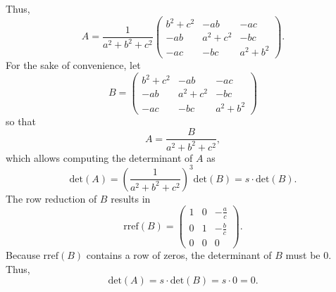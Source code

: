\documentclass[12pt]{article}
\begin{document}
Thus,
\begin{equation*}
	A
	=
	\frac{1}{a^2 + b^2 + c^2}
	\begin{pmatrix}
		b^2 + c^2 & -ab & -ac \\
		-ab & a^2 + c^2 & -bc \\
		-ac & -bc & a^2 + b^2
	\end{pmatrix}
	.
\end{equation*}
For the sake of convenience, let
\begin{equation*}
	B
	=
	\begin{pmatrix}
		b^2 + c^2 & -ab & -ac \\
		-ab & a^2 + c^2 & -bc \\
		-ac & -bc & a^2 + b^2
	\end{pmatrix}
\end{equation*}
so that
\begin{equation*}
	A = \frac{B}{a^2 + b^2 + c^2},
\end{equation*}
which allows computing the determinant of $A$ as
\begin{equation*}
	\text{det}(A)
	=
	\left( \frac{1}{a^2 + b^2 + c^2} \right)^3
	\text{det}(B)
	=
	s \cdot \text{det}(B)
	.
\end{equation*}
The row reduction of $B$ results in
\begin{equation*}
	\text{rref}(B)
	=
	\begin{pmatrix}
		1 & 0 & -\frac{a}{c} \\
		0 & 1 & -\frac{b}{c} \\
		0 & 0 & 0
	\end{pmatrix}
	.
\end{equation*}
Because $\text{rref}(B)$ contains a row of zeros, the determinant of $B$ must
be $0$. \\
Thus,
\begin{equation*}
	\text{det}(A)
	=
	s \cdot \text{det}(B)
	=
	s \cdot 0
	=
	\boxed{0}
	.
\end{equation*}
	
\end{document}

